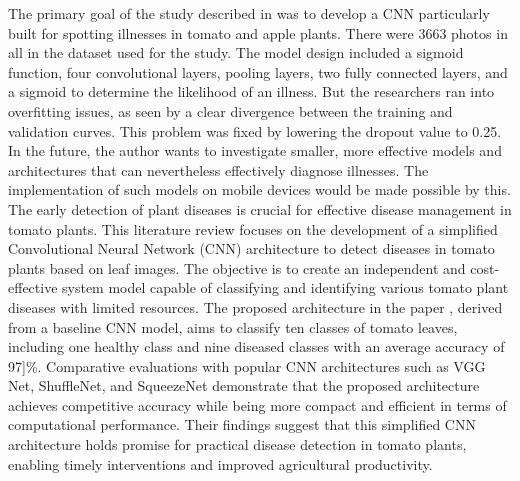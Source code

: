 \documentclass[conference]{IEEEtran}
\begin{document}
The primary goal of the study described in \cite{8711701} was to develop a CNN particularly built for spotting illnesses in tomato and apple plants. There were 3663 photos in all in the dataset used for the study. The model design included a sigmoid function, four convolutional layers, pooling layers, two fully connected layers, and a sigmoid to determine the likelihood of an illness. But the researchers ran into overfitting issues, as seen by a clear divergence between the training and validation curves. This problem was fixed by lowering the dropout value to 0.25. In the future, the author wants to investigate smaller, more effective models and architectures that can nevertheless effectively diagnose illnesses. The implementation of such models on mobile devices would be made possible by this.\\

The early detection of plant diseases is crucial for effective disease management in tomato plants. This literature review focuses on the development of a simplified Convolutional Neural Network (CNN) architecture to detect diseases in tomato plants based on leaf images. The objective is to create an independent and cost-effective system model capable of classifying and identifying various tomato plant diseases with limited resources. The proposed architecture in the paper \cite{sembiring2021development}, derived from a baseline CNN model, aims to classify ten classes of tomato leaves, including one healthy class and nine diseased classes with an average accuracy of 97]\%. Comparative evaluations with popular CNN architectures such as VGG Net, ShuffleNet, and SqueezeNet demonstrate that the proposed architecture achieves competitive accuracy while being more compact and efficient in terms of computational performance. Their findings suggest that this simplified CNN architecture holds promise for practical disease detection in tomato plants, enabling timely interventions and improved agricultural productivity.\\
\end{document}
